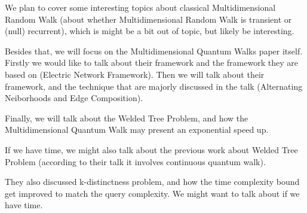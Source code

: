 \documentclass{article}%
\begin{document}
We plan to cover some interesting topics about classical Multidimensional Random Walk
(about whether Multidimensional Random Walk is transient or (null) recurrent),
which is might be a bit out of topic, but likely be interesting.

Besides that, we will focus on the Multidimensional Quantum Walks paper itself.
Firstly we would like to talk about their framework and the framework they
are based on (Electric Network Framework). Then we will talk about their framework,
and the technique that are majorly discussed in the talk (Alternating Neiborhoods
and Edge Composition).

Finally, we will talk about the Welded Tree Problem, and how the
Multidimensional Quantum Walk may present an exponential speed up.

If we have time, we might also talk about the previous work about Welded Tree Problem
(according to their talk it involves continuous quantum walk).

They also discussed k-distinctness problem, and how the time complexity bound
get improved to match the query complexity. We might want to talk about if we have time.





\end{document}
